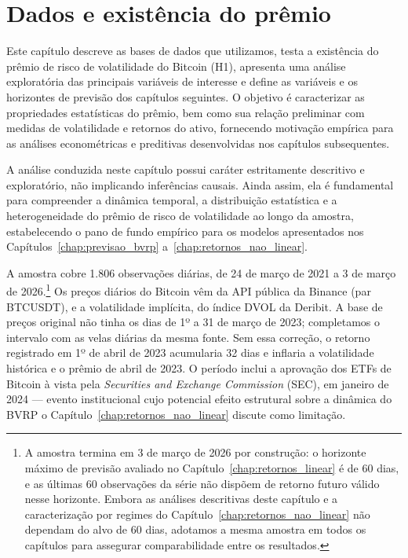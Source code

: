 \chapter{Dados e existência do prêmio}
\label{chap:dados}

Este capítulo descreve as bases de dados que utilizamos, testa a
existência do prêmio de risco de volatilidade do Bitcoin (H1), apresenta uma
análise exploratória das principais variáveis de interesse e define as
variáveis e os horizontes de previsão dos capítulos seguintes. O objetivo é
caracterizar as propriedades estatísticas do prêmio, bem como sua relação
preliminar com medidas de volatilidade e retornos do ativo, fornecendo
motivação empírica para as análises econométricas e preditivas desenvolvidas
nos capítulos subsequentes.

A análise conduzida neste capítulo possui caráter
estritamente descritivo e exploratório, não implicando inferências causais.
Ainda assim, ela é fundamental para compreender a dinâmica temporal, a
distribuição estatística e a heterogeneidade do prêmio de risco de volatilidade
ao longo da amostra, estabelecendo o pano de fundo empírico para os modelos
apresentados nos Capítulos~\ref{chap:previsao_bvrp} a~\ref{chap:retornos_nao_linear}.

A amostra cobre 1.806 observações diárias, de 24 de março de 2021 a 3 de março de 2026.\footnote{A amostra termina em 3 de março de 2026 por construção: o horizonte máximo de previsão avaliado no Capítulo~\ref{chap:retornos_linear} é de 60 dias, e as últimas 60 observações da série não dispõem de retorno futuro válido nesse horizonte. Embora as análises descritivas deste capítulo e a caracterização por regimes do Capítulo~\ref{chap:retornos_nao_linear} não dependam do alvo de 60 dias, adotamos a mesma amostra em todos os capítulos para assegurar comparabilidade entre os resultados.} Os preços diários do Bitcoin vêm da API pública da Binance (par BTCUSDT), e a volatilidade implícita, do índice DVOL da Deribit. A base de preços original não tinha os dias de 1º a 31 de março de 2023; completamos o intervalo com as velas diárias da mesma fonte. Sem essa correção, o retorno registrado em 1º de abril de 2023 acumularia 32 dias e inflaria a volatilidade histórica e o prêmio de abril de 2023. O período inclui a aprovação dos ETFs de Bitcoin à vista pela \textit{Securities and Exchange Commission} (SEC), em janeiro de 2024 --- evento institucional cujo potencial efeito estrutural sobre a dinâmica do BVRP o Capítulo~\ref{chap:retornos_nao_linear} discute como limitação.

